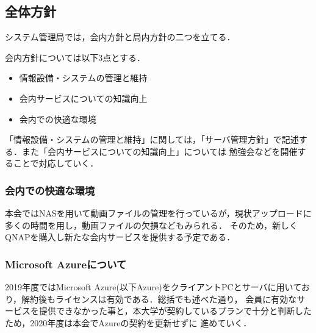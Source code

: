 \subsection*{全体方針}


システム管理局では，会内方針と局内方針の二つを立てる．

会内方針については以下3点とする．
\begin{itemize}
    \item 情報設備・システムの管理と維持
    \item 会内サービスについての知識向上
    \item 会内での快適な環境
  \end{itemize}

「情報設備・システムの管理と維持」に関しては，「サーバ管理方針」で記述する．また「会内サービスについての知識向上」については
勉強会などを開催することで対応していく．
\subsubsection*{会内での快適な環境}
本会ではNASを用いて動画ファイルの管理を行っているが，現状アップロードに多くの時間を用し，動画ファイルの欠損などもみられる．
そのため，新しくQNAPを購入し新たな会内サービスを提供する予定である．

\subsubsection*{Microsoft Azureについて}
2019年度ではMicrosoft Azure(以下Azure)をクライアントPCとサーバに用いており，解約後もライセンスは有効である．総括でも述べた通り，
会員に有効なサービスを提供できなかった事と，本大学が契約しているプランで十分と判断したため，2020年度は本会でAzureの契約を更新せずに
進めていく．



  